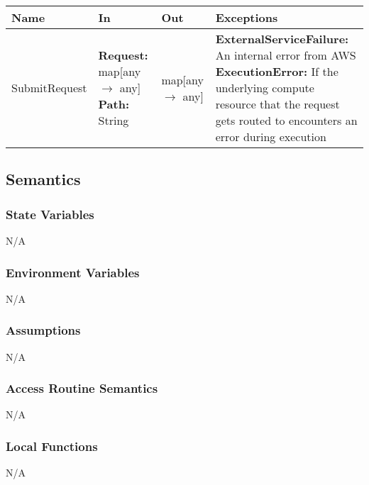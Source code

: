 \documentclass[12pt, titlepage]{article}
\begin{document}
\begin{center}
  \begin{tabular}{>{\raggedright}p{3cm} >{\raggedright}p{5cm}
    >{\raggedright}p{4cm} p{4cm}}
    \hline
    \textbf{Name} & \textbf{In} & \textbf{Out} & \textbf{Exceptions} \\
    \hline
    SubmitRequest & \textbf{Request:} map[any $\rightarrow$ any]
    \newline \textbf{Path:} String & map[any $\rightarrow$ any] &
    \textbf{ExternalServiceFailure:} An internal error from
    AWS \newline \textbf{ExecutionError:} If the underlying compute
    resource that the request gets routed to encounters an error
    during execution \\
    \hline
  \end{tabular}
\end{center}

\subsection{Semantics}

\subsubsection{State Variables}

N/A

\subsubsection{Environment Variables}

N/A

\subsubsection{Assumptions}

N/A

\subsubsection{Access Routine Semantics}

N/A

\subsubsection{Local Functions}

N/A

\end{document}
